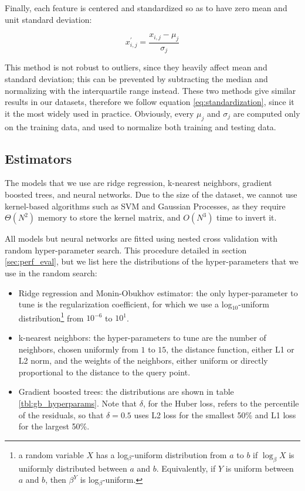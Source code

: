 \documentclass[a4paper]{book}
\begin{document}
Finally, each feature is centered and standardized so as to have zero mean and unit standard deviation:

\begin{equation}
\label{eq:standardization}
x^\prime_{i,j}=\frac{x_{i,j}-\mu_j}{\sigma_j}
\end{equation}

This method is not robust to outliers, since they heavily affect mean and standard deviation; this can be prevented by subtracting the median and normalizing with the interquartile range instead. These two methods give similar results in our datasets, therefore we follow equation \ref{eq:standardization}, since it it the most widely used in practice. Obviously, every $\mu_j$ and $\sigma_j$ are computed only on the training data, and used to normalize both training and testing data.

\subsection{Estimators}

The models that we use are ridge regression, k-nearest neighbors, gradient boosted trees, and neural networks. Due to the size of the dataset, we cannot use kernel-based algorithms such as SVM and Gaussian Processes, as they require $\Theta(N^2)$ memory to store the kernel matrix, and $O(N^3)$ time to invert it.

All models but neural networks are fitted using nested cross validation with random hyper-parameter search. This procedure detailed in section \ref{sec:perf_eval}, but we list here the distributions of the hyper-parameters that we use in the random search:

\begin{itemize}
\item Ridge regression and Monin-Obukhov estimator: the only hyper-parameter to tune is the regularization coefficient, for which we use a log$_{10}$-uniform distribution\footnote{a random variable $X$ has a log$_\beta$-uniform distribution from $a$ to $b$ if $\log_\beta X$ is uniformly distributed between $a$ and $b$. Equivalently, if $Y$ is uniform between $a$ and $b$, then $\beta^Y$ is log$_\beta$-uniform.} from $10^{-6}$ to $10^{1}$.

\item k-nearest neighbors: the hyper-parameters to tune are the number of neighbors, chosen uniformly from $1$ to $15$, the distance function, either L1 or L2 norm, and the weights of the neighbors, either uniform or directly proportional to the distance to the query point.

\item Gradient boosted trees: the distributions are shown in table \ref{tbl:gb_hyperparams}. Note that $\delta$, for the Huber loss, refers to the percentile of the residuals, so that $\delta=0.5$ uses L2 loss for the smallest 50\% and L1 loss for the largest 50\%.
\end{itemize}
\end{document}
